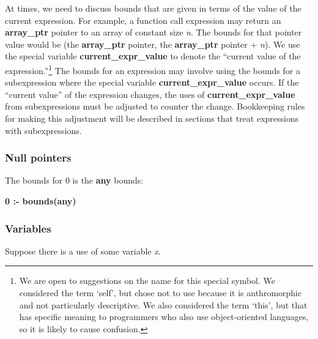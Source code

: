 \documentclass[]{article}
\begin{document}
At times, we need to discuss bounds that are given in terms of the value
of the current expression. For example, a function call expression may
return an \textbf{array\_ptr} pointer to an array of constant size
\emph{n}. The bounds for that pointer value would be (the
\textbf{array\_ptr} pointer, the \textbf{array\_ptr} pointer +
\emph{n}). We use the special variable \textbf{current\_expr\_value} to
denote the ``current value of the expression.''\footnote{We are open to
  suggestions on the name for this special symbol. We considered the
  term `self', but chose not to use because it is anthromorphic and not
  particularly descriptive. We also considered the term `this', but that
  has specific meaning to programmers who also use object-oriented
  languages, so it is likely to cause confusion.} The bounds for an
expression may involve using the bounds for a subexpression where the
special variable \textbf{current\_expr\_value} occurs. If the ``current
value'' of the expression changes, the uses of
\textbf{current\_expr\_value} from subexpressions must be adjusted to
counter the change. Bookkeeping rules for making this adjustment will be
described in sections that treat expressions with subexpressions.

\subsubsection{\texorpdfstring{\protect\hypertarget{ux5fToc435434949}{}{\protect\hypertarget{ux5fToc437460775}{}{\protect\hypertarget{ux5fToc440445454}{}{\protect\hypertarget{ux5fToc440449236}{}{\protect\hypertarget{ux5fToc440551886}{}{}}}}}Null
pointers}{Null pointers}}\label{null-pointers}

The bounds for 0 is the \textbf{any} bounds:

\textbf{0 :- bounds(any)}

\subsubsection{\texorpdfstring{\protect\hypertarget{ux5fRef418872096}{}{\protect\hypertarget{ux5fToc435434950}{}{\protect\hypertarget{ux5fToc437460776}{}{\protect\hypertarget{ux5fToc440445455}{}{\protect\hypertarget{ux5fToc440449237}{}{\protect\hypertarget{ux5fToc440551887}{}{}}}}}}Variables}{Variables}}\label{variables}

Suppose there is a use of some variable \emph{x}.
\end{document}
